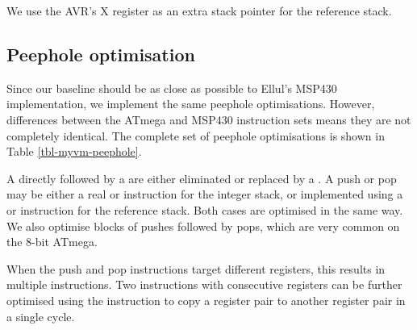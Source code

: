 We use the AVR's X register as an extra stack pointer for the reference stack.

\subsection{Peephole optimisation}
Since our baseline should be as close as possible to Ellul's MSP430 implementation, we implement the same peephole optimisations. However, differences between the ATmega and MSP430 instruction sets means they are not completely identical. The complete set of peephole optimisations is shown in Table \ref{tbl-myvm-peephole}.

A  directly followed by a  are either eliminated or replaced by a . A push or pop may be either a real  or  instruction for the integer stack, or implemented using a  or  instruction for the reference stack. Both cases are optimised in the same way. We also optimise blocks of pushes followed by pops, which are very common on the 8-bit ATmega. 

When the push and pop instructions target different registers, this results in multiple  instructions. Two  instructions with consecutive registers can be further optimised using the  instruction to copy a register pair to another register pair in a single cycle.


